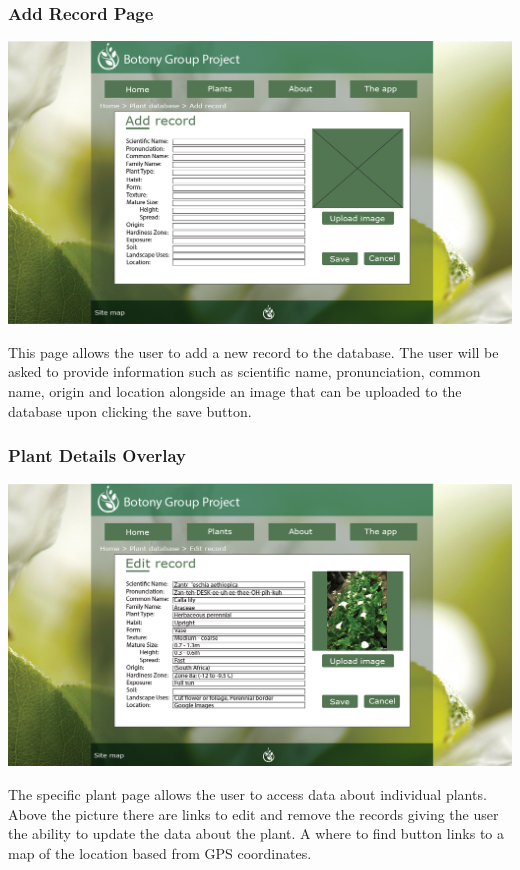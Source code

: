 		\subsubsection{Add Record Page}
			\begin{center}
				\includegraphics[scale=0.5]{uiDesign/uiwebimages/addrecord.png}
			\end{center}
		This page allows the user to add a new record to the database. The user will be asked to provide information such as scientific name, pronunciation, common name, origin and location alongside an image that can be uploaded to the database upon clicking the save button. 
		
		\subsubsection{Plant Details Overlay}
			\begin{center}
				\includegraphics[scale=0.5]{uiDesign/uiwebimages/edit.png}
			\end{center}
			The specific plant page allows the user to access data about individual plants. Above the picture there are links to edit and remove the records giving the user the ability to update the data about the plant. A where to find button links to a map of the location based from GPS coordinates.

